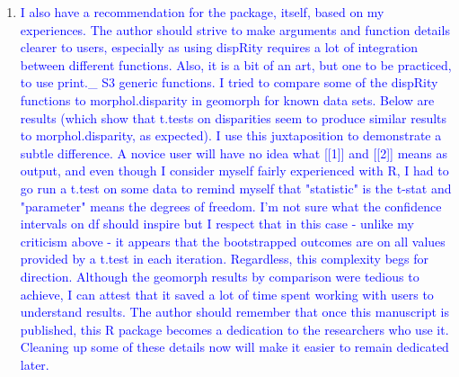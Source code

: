 \documentclass[12pt,letterpaper]{article}
\begin{document}
\begin{enumerate}
\begin{itemize}
\end{itemize}

\item{\textcolor{blue}{I also have a recommendation for the package, itself, based on my experiences. 
The author should strive to make arguments and function details clearer to users, especially as using dispRity requires a lot of integration between different functions. 
Also, it is a bit of an art, but one to be practiced, to use print.\_ S3 generic functions. 
I tried to compare some of the dispRity functions to morphol.disparity in geomorph for known data sets. 
Below are results (which show that t.tests on disparities seem to produce similar results to morphol.disparity, as expected). 
I use this juxtaposition to demonstrate a subtle difference. 
A novice user will have no idea what [[1]] and [[2]] means as output, and even though I consider myself fairly experienced with R, I had to go run a t.test on some data to remind myself that "statistic" is the t-stat and "parameter" means the degrees of freedom. 
I'm not sure what the confidence intervals on df should inspire but I respect that in this case - unlike my criticism above - it appears that the bootstrapped outcomes are on all values provided by a t.test in each iteration. 
Regardless, this complexity begs for direction. 
Although the geomorph results by comparison were tedious to achieve, I can attest that it saved a lot of time spent working with users to understand results. 
The author should remember that once this manuscript is published, this R package becomes a dedication to the researchers who use it. 
Cleaning up some of these details now will make it easier to remain dedicated later.}}


\end{enumerate}





\end{document}
